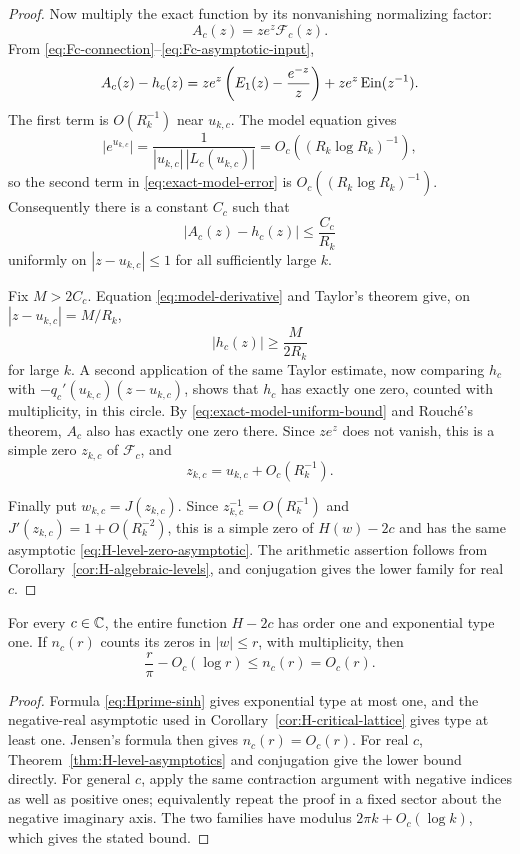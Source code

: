 \begin{proof}
Now multiply the exact function by its nonvanishing normalizing factor:
\[
 A_c(z)=ze^z\mathcal F_c(z).
\]
From \eqref{eq:Fc-connection}--\eqref{eq:Fc-asymptotic-input},
\begin{equation}\label{eq:exact-model-error}
 A_c(z)-h_c(z)
 =ze^z\left(E_1(z)-\frac{e^{-z}}z\right)
  +ze^z\operatorname{Ein}(z^{-1}).
\end{equation}
The first term is $O(R_k^{-1})$ near $u_{k,c}$.  The model equation gives
\[
 |e^{u_{k,c}}|
 =\frac1{|u_{k,c}|\,|L_c(u_{k,c})|}
 =O_c((R_k\log R_k)^{-1}),
\]
so the second term in \eqref{eq:exact-model-error} is
$O_c((R_k\log R_k)^{-1})$.  Consequently there is a constant $C_c$ such
that
\begin{equation}\label{eq:exact-model-uniform-bound}
 |A_c(z)-h_c(z)|\leq \frac{C_c}{R_k}
\end{equation}
uniformly on $|z-u_{k,c}|\leq1$ for all sufficiently large $k$.

Fix $M>2C_c$.  Equation \eqref{eq:model-derivative} and Taylor's theorem
give, on $|z-u_{k,c}|=M/R_k$,
\[
 |h_c(z)|\geq\frac{M}{2R_k}
\]
for large $k$.  A second application of the same Taylor estimate, now
comparing $h_c$ with
$-q_c'(u_{k,c})(z-u_{k,c})$, shows that $h_c$ has exactly one zero, counted
with multiplicity, in this circle.  By
\eqref{eq:exact-model-uniform-bound} and Rouch\'e's theorem, $A_c$ also has
exactly one zero there.  Since $ze^z$ does not vanish, this is a simple zero
$z_{k,c}$ of $\mathcal F_c$, and
\[
 z_{k,c}=u_{k,c}+O_c(R_k^{-1}).
\]

Finally put $w_{k,c}=J(z_{k,c})$.  Since
$z_{k,c}^{-1}=O(R_k^{-1})$ and $J'(z_{k,c})=1+O(R_k^{-2})$, this is a
simple zero of $H(w)-2c$ and has the same asymptotic
\eqref{eq:H-level-zero-asymptotic}.  The arithmetic assertion follows from
Corollary~\ref{cor:H-algebraic-levels}, and conjugation gives the lower
family for real $c$.
\end{proof}

\begin{corollary}
\label{cor:H-order-zero-count}
For every $c\in\mathbb C$, the entire function $H-2c$ has order one and
exponential type one.  If $n_c(r)$ counts its zeros in $|w|\leq r$, with
multiplicity, then
\[
 \frac{r}{\pi}-O_c(\log r)\leq n_c(r)=O_c(r).
\]
\end{corollary}

\begin{proof}
Formula \eqref{eq:Hprime-sinh} gives exponential type at most one, and the
negative-real asymptotic used in Corollary~\ref{cor:H-critical-lattice}
gives type at least one.  Jensen's formula then gives $n_c(r)=O_c(r)$.
For real $c$, Theorem~\ref{thm:H-level-asymptotics} and conjugation give the
lower bound directly.  For general $c$, apply the same contraction argument
with negative indices as well as positive ones; equivalently repeat the
proof in a fixed sector about the negative imaginary axis.  The two
families have modulus $2\pi k+O_c(\log k)$, which gives the stated bound.
\end{proof}

